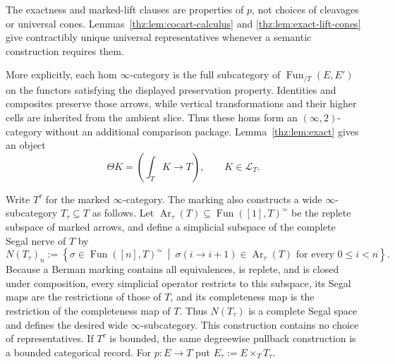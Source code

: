 \documentclass[oneside]{article}
\theoremstyle{plain}
\theoremstyle{definition}
\theoremstyle{remark}
\newcommand{\Fun}{\operatorname{Fun}}
\begin{document}
The exactness and marked-lift clauses are properties of $p$, not choices of
cleavages or universal cones.  Lemmas~\ref{thz:lem:cocart-calculus} and
\ref{thz:lem:exact-lift-cones} give contractibly unique universal
representatives whenever a semantic construction requires them.

More explicitly, each hom $\infty$-category is the full subcategory of
$\Fun_{/T}(E,E')$ on the functors satisfying the displayed preservation
property.  Identities and composites preserve those arrows, while vertical
transformations and their higher cells are inherited from the ambient slice.
Thus these homs form an $(\infty,2)$-category without an additional
comparison package.  Lemma~\ref{thz:lem:exact} gives an object
\[
 \Theta K=\left(\int_TK\longrightarrow T\right),
 \qquad K\in\mathcal L_T.
\]

Write $T^\tau$ for the marked $\infty$-category.  The marking also
constructs a wide $\infty$-subcategory $T_\tau\subseteq T$ as follows.  Let
$\operatorname{Ar}_\tau(T)\subseteq\Fun([1],T)^{\simeq}$ be the replete
subspace of marked arrows, and define a simplicial subspace of the complete
Segal nerve of $T$ by
\[
 N(T_\tau)_n:=
 \left\{\sigma\in\Fun([n],T)^{\simeq}\ \middle|\
 \sigma(i\to i+1)\in\operatorname{Ar}_\tau(T)
 \text{ for every }0\leq i<n\right\}.
\]
Because a Berman marking contains all equivalences, is replete, and is closed
under composition, every simplicial operator restricts to this subspace, its
Segal maps are the restrictions of those of $T$, and its completeness map is
the restriction of the completeness map of $T$.  Thus $N(T_\tau)$ is a
complete Segal space and defines the desired wide $\infty$-subcategory.  This
construction contains no choice of representatives.  If $T^\tau$ is bounded,
the same degreewise pullback construction is a bounded categorical record.  For
$p:E\to T$ put $E_\tau:=E\times_TT_\tau$.
\end{document}
